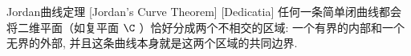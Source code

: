 \documentclass[UTF8]{ctexart}
\begin{document}


        \begin{thm}
            [UUID]
            {Jordan曲线定理}
            [Jordan's Curve Theorem]
            [Dedicatia]
            任何一条简单闭曲线都会将二维平面（如复平面 \(\C\) ）恰好分成两个不相交的区域: 一个有界的内部和一个无界的外部, 并且这条曲线本身就是这两个区域的共同边界. 
        \end{thm}



\end{document}

